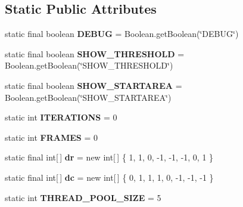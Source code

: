 \subsection*{Static Public Attributes}
\begin{DoxyCompactItemize}
\item 
\hypertarget{classdev_1_1boxy_1_1fortyfive_1_1_forty_five_a49f6e7e22ddefd3917fcd8e81e43eab5}{
static final boolean {\bfseries DEBUG} = Boolean.getBoolean(\char`\"{}DEBUG\char`\"{})}
\label{de/df3/classdev_1_1boxy_1_1fortyfive_1_1_forty_five_a49f6e7e22ddefd3917fcd8e81e43eab5}

\item 
\hypertarget{classdev_1_1boxy_1_1fortyfive_1_1_forty_five_a1241bab2675901ba6ca777e6322d245c}{
static final boolean {\bfseries SHOW\_\-THRESHOLD} = Boolean.getBoolean(\char`\"{}SHOW\_\-THRESHOLD\char`\"{})}
\label{de/df3/classdev_1_1boxy_1_1fortyfive_1_1_forty_five_a1241bab2675901ba6ca777e6322d245c}

\item 
\hypertarget{classdev_1_1boxy_1_1fortyfive_1_1_forty_five_aafe4eae15b3395c2ea1a7735e6dbef46}{
static final boolean {\bfseries SHOW\_\-STARTAREA} = Boolean.getBoolean(\char`\"{}SHOW\_\-STARTAREA\char`\"{})}
\label{de/df3/classdev_1_1boxy_1_1fortyfive_1_1_forty_five_aafe4eae15b3395c2ea1a7735e6dbef46}

\item 
\hypertarget{classdev_1_1boxy_1_1fortyfive_1_1_forty_five_ad7491f171d5c4bff19e2e8c3f7d9142d}{
static int {\bfseries ITERATIONS} = 0}
\label{de/df3/classdev_1_1boxy_1_1fortyfive_1_1_forty_five_ad7491f171d5c4bff19e2e8c3f7d9142d}

\item 
\hypertarget{classdev_1_1boxy_1_1fortyfive_1_1_forty_five_ad7b36ef04bc39c5b67071b5f803b1221}{
static int {\bfseries FRAMES} = 0}
\label{de/df3/classdev_1_1boxy_1_1fortyfive_1_1_forty_five_ad7b36ef04bc39c5b67071b5f803b1221}

\item 
\hypertarget{classdev_1_1boxy_1_1fortyfive_1_1_forty_five_a7d6468fba3c839baaa779ac41ce4e18f}{
static final int\mbox{[}$\,$\mbox{]} {\bfseries dr} = new int\mbox{[}$\,$\mbox{]} \{ 1, 1, 0, -\/1, -\/1, -\/1, 0, 1 \}}
\label{de/df3/classdev_1_1boxy_1_1fortyfive_1_1_forty_five_a7d6468fba3c839baaa779ac41ce4e18f}

\item 
\hypertarget{classdev_1_1boxy_1_1fortyfive_1_1_forty_five_aadd79f87c6a4392e1f8a52587635fd46}{
static final int\mbox{[}$\,$\mbox{]} {\bfseries dc} = new int\mbox{[}$\,$\mbox{]} \{ 0, 1, 1, 1, 0, -\/1, -\/1, -\/1 \}}
\label{de/df3/classdev_1_1boxy_1_1fortyfive_1_1_forty_five_aadd79f87c6a4392e1f8a52587635fd46}

\item 
\hypertarget{classdev_1_1boxy_1_1fortyfive_1_1_forty_five_accee5dd9d0cbb72be93d873912c820b7}{
static int {\bfseries THREAD\_\-POOL\_\-SIZE} = 5}
\label{de/df3/classdev_1_1boxy_1_1fortyfive_1_1_forty_five_accee5dd9d0cbb72be93d873912c820b7}

\end{DoxyCompactItemize}
